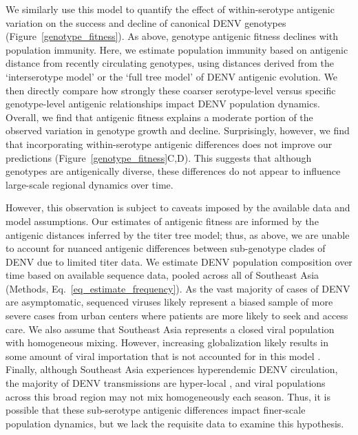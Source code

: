 \documentclass[11pt,oneside,letterpaper]{article}
\begin{document}
We similarly use this model to quantify the effect of within-serotype antigenic variation on the success and decline of canonical DENV genotypes (Figure~\ref{genotype_fitness}).
As above, genotype antigenic fitness declines with population immunity.
Here, we estimate population immunity based on antigenic distance from recently circulating genotypes, using distances derived from the `interserotype model' or the `full tree model' of DENV antigenic evolution.
We then directly compare how strongly these coarser serotype-level versus specific genotype-level antigenic relationships impact DENV population dynamics.
Overall, we find that antigenic fitness explains a moderate portion of the observed variation in genotype growth and decline.
Surprisingly, however, we find that incorporating within-serotype antigenic differences does not improve our predictions (Figure~\ref{genotype_fitness}C,D).
This suggests that although genotypes are antigenically diverse, these differences do not appear to influence large-scale regional dynamics over time.

However, this observation is subject to caveats imposed by the available data and model assumptions.
Our estimates of antigenic fitness are informed by the antigenic distances inferred by the titer tree model; thus, as above, we are unable to account for nuanced antigenic differences between sub-genotype clades of DENV due to limited titer data.
We estimate DENV population composition over time based on available sequence data, pooled across all of Southeast Asia (Methods, Eq.~\ref{eq_estimate_frequency}).
As the vast majority of cases of DENV are asymptomatic, sequenced viruses likely represent a biased sample of more severe cases from urban centers where patients are more likely to seek and access care.
We also assume that Southeast Asia represents a closed viral population with homogeneous mixing.
However, increasing globalization likely results in some amount of viral importation that is not accounted for in this model \citep{allicock2012phylogeography}.
Finally, although Southeast Asia experiences hyperendemic DENV circulation, the majority of DENV transmissions are hyper-local \citep{salje2017dengue}, and viral populations across this broad region may not mix homogeneously each season.
Thus, it is possible that these sub-serotype antigenic differences impact finer-scale population dynamics, but we lack the requisite data to examine this hypothesis.
\end{document}
